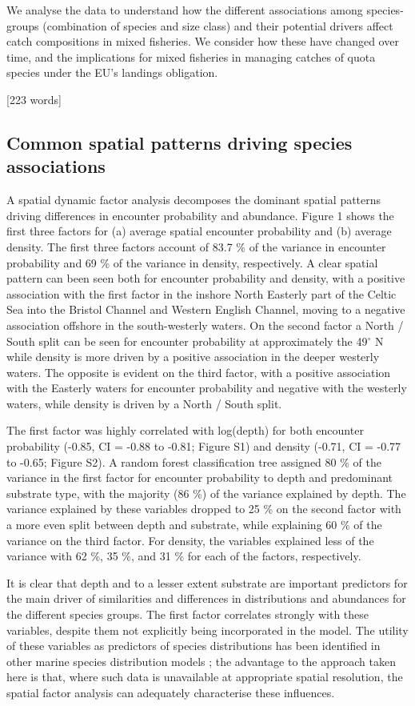 \documentclass{nature}
\begin{document}
\begin{linenumbers}
We analyse the data to understand how the different associations among
species-groups (combination of species and size class) and their potential
drivers affect catch compositions in mixed fisheries. We consider how these
have changed over time, and the implications for mixed fisheries in managing
catches of quota species under the EU's landings obligation.

[223 words]

\subsection{Common spatial patterns driving species associations} A spatial
dynamic factor analysis decomposes the dominant spatial patterns driving
differences in encounter probability and abundance. Figure 1 shows the first
three factors for (a) average spatial encounter probability and (b) average
density. The first three factors account of 83.7 \% of the variance in
encounter probability and 69 \% of the variance in density, respectively. A
clear spatial pattern can been seen both for encounter probability and density,
with a positive association with the first factor in the inshore North Easterly
part of the Celtic Sea into the Bristol Channel and Western English Channel,
moving to a negative association offshore in the south-westerly waters. On the
second factor a North / South split can be seen for encounter probability at
approximately the 49$^{\circ}$ N while density is more driven by a positive
association in the deeper westerly waters.  The opposite is evident on the
third factor, with a positive association with the Easterly waters for
encounter probability and negative with the westerly waters, while density is
driven by a North / South split.

The first factor was highly correlated with log(depth) for both encounter
probability (-0.85, CI = -0.88 to -0.81; Figure S1) and density (-0.71, CI =
-0.77 to -0.65; Figure S2). A random forest classification tree assigned 80 \%
of the variance in the first factor for encounter probability to depth and
predominant substrate type, with the majority (86 \%) of the variance explained
by depth. The variance explained by these variables dropped to 25 \% on the
second factor with a more even split between depth and substrate, while
explaining 60 \% of the variance on the third factor.  For density, the
variables explained less of the variance with 62 \%, 35 \%, and 31 \% for each
of the factors, respectively.

It is clear that depth and to a lesser extent substrate are important
predictors for the main driver of similarities and differences in distributions
and abundances for the different species groups. The first factor correlates
strongly with these variables, despite them not explicitly being incorporated
in the model. The utility of these variables as predictors of species
distributions has been identified in other marine species distribution models
\cite{Robinson2011}; the advantage to the approach taken here is that, where
such data is unavailable at appropriate spatial resolution, the spatial factor
analysis can adequately characterise these influences.


\end{linenumbers}
\end{document}
